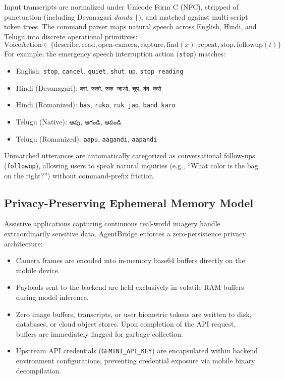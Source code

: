 \documentclass[10pt,a4paper]{article}
\begin{document}
Input transcripts are normalized under Unicode Form C (NFC), stripped of punctuation (including Devanagari \textit{danda} \texttt{|}), and matched against multi-script token trees. The command parser maps natural speech across English, Hindi, and Telugu into discrete operational primitives:
\begin{equation}
    \text{VoiceAction} \in \{\text{describe}, \text{read}, \text{open-camera}, \text{capture}, \text{find}(x), \text{repeat}, \text{stop}, \text{followup}(t)\}
\end{equation}
For example, the emergency speech interruption action (\texttt{stop}) matches:
\begin{itemize}
    \item English: \texttt{stop}, \texttt{cancel}, \texttt{quiet}, \texttt{shut up}, \texttt{stop reading}
    \item Hindi (Devanagari): \texttt{बस}, \texttt{रुको}, \texttt{रुक जाओ}, \texttt{चुप}, \texttt{बंद करो}
    \item Hindi (Romanized): \texttt{bas}, \texttt{ruko}, \texttt{ruk jao}, \texttt{band karo}
    \item Telugu (Native): \texttt{ఆపు}, \texttt{ఆగండి}, \texttt{ఆపండి}
    \item Telugu (Romanized): \texttt{aapu}, \texttt{aagandi}, \texttt{aapandi}
\end{itemize}
Unmatched utterances are automatically categorized as conversational follow-ups (\texttt{followup}), allowing users to speak natural inquiries (e.g., ``What color is the bag on the right?'') without command-prefix friction.

\subsection{Privacy-Preserving Ephemeral Memory Model}
Assistive applications capturing continuous real-world imagery handle extraordinarily sensitive data. AgentBridge enforces a zero-persistence privacy architecture:
\begin{itemize}
    \item Camera frames are encoded into in-memory base64 buffers directly on the mobile device.
    \item Payloads sent to the backend are held exclusively in volatile RAM buffers during model inference.
    \item Zero image buffers, transcripts, or user biometric tokens are written to disk, databases, or cloud object stores. Upon completion of the API request, buffers are immediately flagged for garbage collection.
    \item Upstream API credentials (\texttt{GEMINI\_API\_KEY}) are encapsulated within backend environment configurations, preventing credential exposure via mobile binary decompilation.
\end{itemize}
\end{document}
